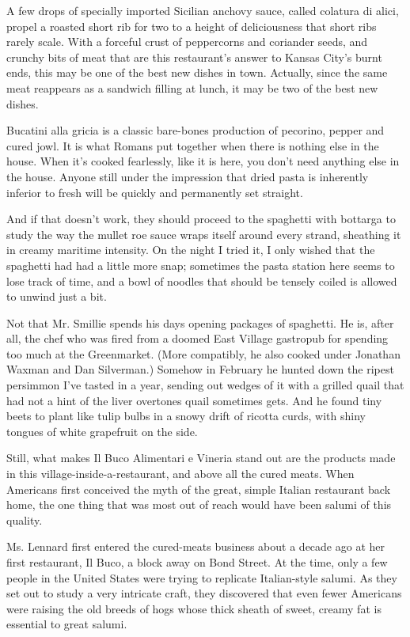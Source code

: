 A few drops of specially imported Sicilian anchovy sauce, called
colatura di alici, propel a roasted short rib for two to a height of
deliciousness that short ribs rarely scale. With a forceful crust of
peppercorns and coriander seeds, and crunchy bits of meat that are this
restaurant's answer to Kansas City's burnt ends, this may be one of the
best new dishes in town. Actually, since the same meat reappears as a
sandwich filling at lunch, it may be two of the best new dishes.

Bucatini alla gricia is a classic bare-bones production of pecorino,
pepper and cured jowl. It is what Romans put together when there is
nothing else in the house. When it's cooked fearlessly, like it is here,
you don't need anything else in the house. Anyone still under the
impression that dried pasta is inherently inferior to fresh will be
quickly and permanently set straight.

And if that doesn't work, they should proceed to the spaghetti with
bottarga to study the way the mullet roe sauce wraps itself around every
strand, sheathing it in creamy maritime intensity. On the night I tried
it, I only wished that the spaghetti had had a little more snap;
sometimes the pasta station here seems to lose track of time, and a bowl
of noodles that should be tensely coiled is allowed to unwind just a
bit.

Not that Mr. Smillie spends his days opening packages of spaghetti. He
is, after all, the chef who was fired from a doomed East Village
gastropub for spending too much at the Greenmarket. (More compatibly, he
also cooked under Jonathan Waxman and Dan Silverman.) Somehow in
February he hunted down the ripest persimmon I've tasted in a year,
sending out wedges of it with a grilled quail that had not a hint of the
liver overtones quail sometimes gets. And he found tiny beets to plant
like tulip bulbs in a snowy drift of ricotta curds, with shiny tongues
of white grapefruit on the side.

Still, what makes Il Buco Alimentari e Vineria stand out are the
products made in this village-inside-a-restaurant, and above all the
cured meats. When Americans first conceived the myth of the great,
simple Italian restaurant back home, the one thing that was most out of
reach would have been salumi of this quality.

Ms. Lennard first entered the cured-meats business about a decade ago at
her first restaurant, Il Buco, a block away on Bond Street. At the time,
only a few people in the United States were trying to replicate
Italian-style salumi. As they set out to study a very intricate craft,
they discovered that even fewer Americans were raising the old breeds of
hogs whose thick sheath of sweet, creamy fat is essential to great
salumi.

